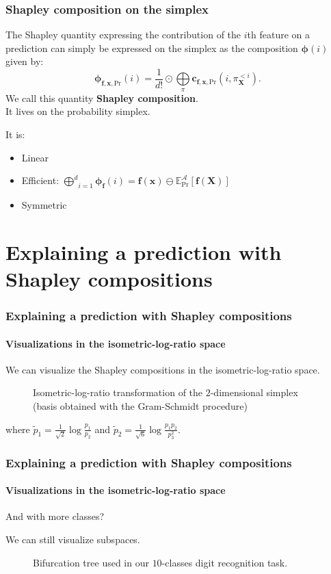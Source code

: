 \documentclass{beamer}
\begin{document}
\begin{frame}
  \frametitle{Shapley composition on the simplex}
  The Shapley quantity expressing the contribution of the $i$th feature on a prediction can simply be expressed on the simplex as the composition $\bm{\phi}(i)$ given by:
\begin{equation}
  \bm{\phi}_{\bm{f},\bm{x},\text{Pr}}(i) = \frac{1}{d!} \odot \underset{\pi}{\bigoplus}\bm{c}_{\bm{f},\bm{x},\text{Pr}}(i,\pi^{<i}_{\bm{X}}).
\end{equation}
We call this quantity {\large\textbf{Shapley composition}}.\\
It lives on the probability simplex.
\vspace{0.5cm}

\pause
It is:
\begin{itemize}
\item Linear 
\item Efficient: $\underset{i=1}{\overset{d}\bigoplus} \bm{\phi}_{\bm{f}}(i) = \bm{f}(\bm{x}) \ominus \mathbb{E}^{\mathcal{A}}_{\text{Pr}}[\bm{f}(\bm{X})]$
\item Symmetric
\end{itemize}

\end{frame}


\section{Explaining a prediction with Shapley compositions}

\begin{frame}
\frametitle{Explaining a prediction with Shapley compositions}
\framesubtitle{Visualizations in the isometric-log-ratio space}

We can visualize the Shapley compositions in the isometric-log-ratio space.
\begin{figure}
  \centering
  
  \caption{Isometric-log-ratio transformation of the $2$-dimensional simplex (basis obtained with the Gram-Schmidt procedure)}
\end{figure}
where $\tilde{p}_1 = \frac{1}{\sqrt{2}} \log \frac{p_1}{p_2}$ and $\tilde{p}_2 = \frac{1}{\sqrt{6}} \log \frac{p_1p_2}{p_3^2}$.
\end{frame}

\begin{frame}
\frametitle{Explaining a prediction with Shapley compositions}
\framesubtitle{Visualizations in the isometric-log-ratio space}

And with more classes?
\vspace{0.2cm}

We can still visualize subspaces.
\pause
\begin{figure}
  \centering
  
  \caption{Bifurcation tree used in our $10$-classes digit recognition task.}
\end{figure}
\end{frame}
\end{document}
